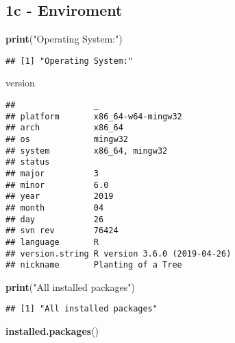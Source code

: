 \documentclass[]{article}
\newenvironment{Shaded}{}{}
\newcommand{\KeywordTok}[1]{\textcolor[rgb]{0.00,0.44,0.13}{\textbf{#1}}}
\newcommand{\NormalTok}[1]{#1}
\newcommand{\StringTok}[1]{\textcolor[rgb]{0.25,0.44,0.63}{#1}}
\begin{document}
\hypertarget{c---enviroment}{%
\subsection{1c - Enviroment}\label{c---enviroment}}

\begin{Shaded}
\begin{Highlighting}[]
\KeywordTok{print}\NormalTok{(}\StringTok{"Operating System:"}\NormalTok{)}
\end{Highlighting}
\end{Shaded}

\begin{verbatim}
## [1] "Operating System:"
\end{verbatim}

\begin{Shaded}
\begin{Highlighting}[]
\NormalTok{version}
\end{Highlighting}
\end{Shaded}

\begin{verbatim}
##                _                           
## platform       x86_64-w64-mingw32          
## arch           x86_64                      
## os             mingw32                     
## system         x86_64, mingw32             
## status                                     
## major          3                           
## minor          6.0                         
## year           2019                        
## month          04                          
## day            26                          
## svn rev        76424                       
## language       R                           
## version.string R version 3.6.0 (2019-04-26)
## nickname       Planting of a Tree
\end{verbatim}

\begin{Shaded}
\begin{Highlighting}[]
\KeywordTok{print}\NormalTok{(}\StringTok{"All installed packages"}\NormalTok{)}
\end{Highlighting}
\end{Shaded}

\begin{verbatim}
## [1] "All installed packages"
\end{verbatim}

\begin{Shaded}
\begin{Highlighting}[]
\KeywordTok{installed.packages}\NormalTok{()}
\end{Highlighting}
\end{Shaded}
\end{document}
